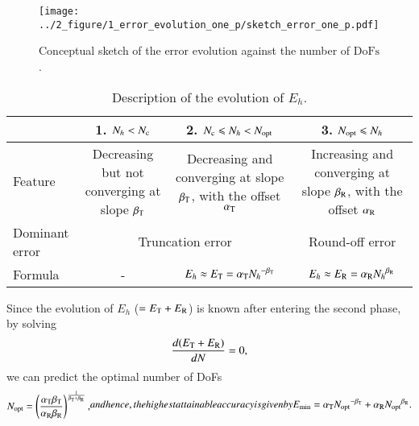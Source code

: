 \documentclass[review,3p]{elsarticle}
\begin{document}
\begin{figure}[!ht]
\centering
   \texttt{[image: ../2\_figure/1\_error\_evolution\_one\_p/sketch\_error\_one\_p.pdf]}
   \caption{Conceptual sketch of the error evolution against the number of $\text{DoFs}$.}
   \label{error_evolution_one_p}
\end{figure}
 
\begin{table}[!ht]
\small
\caption [sss] {Description of the evolution of $E_h$.}
\label{phases_error}
\centering
 \begin{tabular}{|l|c|c|c|} \hline   
 & 1. {$N_h < N_{\rm c}$} & 2. {$N_{\rm c} \leqslant N_h < N_{\rm opt}$} & 3. {$N_{\rm opt} \leqslant N_h$} \\ \hline
Feature & \makecell[l]{Decreasing but not\\ converging at slope $\beta_{\rm T}$} & \makecell[l]{Decreasing and converging\\ at slope $\beta_{\rm T}$, with the offset $\alpha_{\rm T}$} & \makecell[l]{Increasing and converging\\ at slope $\beta_{\rm R}$, with the offset $\alpha_{\rm R}$} \\	\hline
Dominant error & \multicolumn{2}{c|}{Truncation error} & Round-off error \\	\hline
Formula & - & $E_h \approx E_{\rm T}=\alpha_{\rm T}{N_h}^{-\beta_{\rm T}}$ & $E_h \approx E_{\rm R}=\alpha_{\rm R} {N_h}^{\beta _{\rm R}}$ \\	\hline
\end{tabular}
\end{table}

Since the evolution of $E_{h}$ ($=E_{\rm T}+E_{\rm R}$) is known after entering the second phase, by solving
\begin{equation}
    \frac{d(E_{\rm T}+E_{\rm R})}{dN}=0,    \label{derivative_condition_N_opt}
\end{equation}
we can predict the optimal number of DoFs
\begin{subequations}
\begin{align}
 N_{\rm opt} = \left( \frac{\alpha_{\rm T} \beta_{\rm T}}{\alpha _{\rm R} \beta_{\rm R}} \right)^{\frac{1}{\beta_{\rm T} + \beta_{\rm R}}},
\end{align}
and hence, the highest attainable accuracy is given by
\begin{align}
 E_{\rm min} = \alpha_{\rm T} {N_{\rm opt}}^{- {\beta _{\rm T}}}+\alpha_{\rm R} {N_{\rm opt}}^{{\beta _{\rm R}}}.
\end{align}
\end{subequations}
\end{document}
